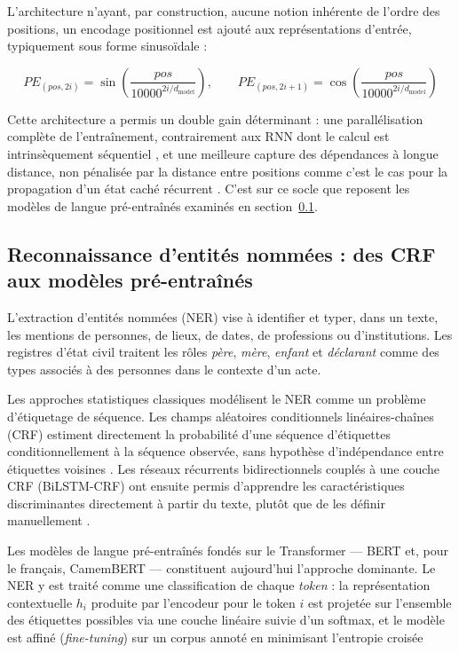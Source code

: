L'architecture n'ayant, par construction, aucune notion inhérente de l'ordre des positions, un encodage positionnel est ajouté aux représentations d'entrée, typiquement sous forme sinusoïdale :

\begin{equation}
    PE_{(pos,2i)} = \sin\!\left(\frac{pos}{10000^{2i/d_{\mathrm{model}}}}\right), \qquad
    PE_{(pos,2i+1)} = \cos\!\left(\frac{pos}{10000^{2i/d_{\mathrm{model}}}}\right)
\end{equation}

Cette architecture a permis un double gain déterminant : une parallélisation complète de l'entraînement, contrairement aux RNN dont le calcul est intrinsèquement séquentiel \cite{vaswani2017attention}, et une meilleure capture des dépendances à longue distance, non pénalisée par la distance entre positions comme c'est le cas pour la propagation d'un état caché récurrent \cite{hochreiter1997lstm}.
C'est sur ce socle que reposent les modèles de langue pré-entraînés examinés en section~\ref{sec:ner}.

\subsection{Reconnaissance d'entités nommées : des CRF aux modèles pré-entraînés}
\label{sec:ner}

L'extraction d'entités nommées (NER) vise à identifier et typer, dans un texte, les mentions de personnes, de lieux, de dates, de professions ou d'institutions.
Les registres d'état civil traitent les rôles \textit{père}, \textit{mère}, \textit{enfant} et \textit{déclarant} comme des types associés à des personnes dans le contexte d'un acte.

Les approches statistiques classiques modélisent le NER comme un problème d'étiquetage de séquence.
Les champs aléatoires conditionnels linéaires-chaînes (CRF) estiment directement la probabilité d'une séquence d'étiquettes conditionnellement à la séquence observée, sans hypothèse d'indépendance entre étiquettes voisines \cite{lafferty2001crf}.
Les réseaux récurrents bidirectionnels couplés à une couche CRF (BiLSTM-CRF) ont ensuite permis d'apprendre les caractéristiques discriminantes directement à partir du texte, plutôt que de les définir manuellement \cite{lample2016neural}.

Les modèles de langue pré-entraînés fondés sur le Transformer --- BERT \cite{devlin2019bert} et, pour le français, CamemBERT \cite{martin2020camembert} --- constituent aujourd'hui l'approche dominante.
Le NER y est traité comme une classification de chaque \textit{token} : la représentation contextuelle $h_i$ produite par l'encodeur pour le token $i$ est projetée sur l'ensemble des étiquettes possibles via une couche linéaire suivie d'un softmax, et le modèle est affiné (\textit{fine-tuning}) sur un corpus annoté en minimisant l'entropie croisée

